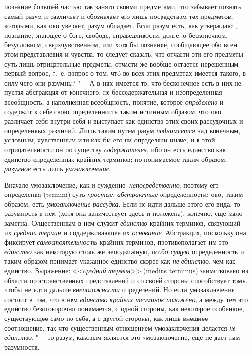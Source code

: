 познание
большей частью так занято своими предметами, что забывает
познать самый разум и различает и обозначает его лишь посредством тех
предметов, которыми, как оно уверяет, разум обладает. Если разум есть, как
утверждают, познание, знающее о боге, свободе, справедливости, долге, о
бесконечном, безусловном, сверхчувственном, или хотя бы познание,
сообщающее обо всем этом представления и чувства, то следует сказать, что
отчасти эти его предметы суть лишь отрицательные предметы, отчасти же
вообще остается нерешенным первый вопрос, т.~е. вопрос о том, чтó во всех
этих предметах имеется такого, в силу чего они разумны? "--- А
в них имеется то, что бесконечное есть в них не пустая абстракция от
конечного, не бессодержательная и неопределенная всеобщность, а наполненная
всеобщность, понятие, которое
{\em определено} и
содержит в себе свою определенность таким истинным образом, что оно
различает себя внутри себя и выступает как единство этих своих рассудочных
и определенных различий. Лишь таким путем разум
{\em поднимается} над
конечным, условным, чувственным или как бы его ни определяли иначе, и в
этой отрицательности он по существу
{\em содержателен}, ибо
он есть единство как единство определенных крайних терминов; но понимаемое
таким образом, {\em разумное}
есть лишь
{\em умозаключение}.

Вначале умозаключение, как и суждение,
{\em непосредственно};
поэтому его определения (termini) суть
{\em простые},
{\em абстрактные}
определенности; оно, таким образом, есть
{\em умозаключение рассудка}.
Если не идти дальше этого его вида, то разумность в нем (хотя
она наличествует здесь и положена), конечно, еще мало заметна. Существенным
в нем служит {\em единство}
крайних терминов, связующий их
{\em средний термин} и
поддерживающее их {\em основание}.
Абстракция, поскольку она фиксирует
{\em самостоятельность}
крайних терминов, противополагает им это
{\em единство} как
некоторую столь же неподвижную,
{\em особо сущую}
определенность и таким образом понимает
указанное единство скорее как
{\em не-единство}, чем
как единство. Выражение: <<{\em средний
термин}>> (medius terminus) заимствовано из области
пространственных представлений и со своей стороны способствует тому, чтобы
не идти дальше {\em внеположности}
определений. Но если умозаключение состоит в том, что в нем
{\em единство крайних терминов
положено}, а между тем это единство безоговорочно
понимается, с одной стороны, как некоторое особенное, существующее само по
себе, а с другой стороны, как лишь внешнее соотношение, так что
существенным отношением умозаключения делается
{\em не-единство}, "--- то
разум, каковым является это умозаключение, еще не дает нам разумности.

